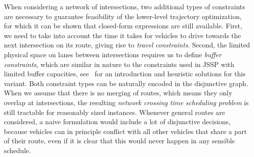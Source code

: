 \documentclass[a4paper]{article}
\theoremstyle{definition}
\theoremstyle{plain}
\begin{document}

When considering a network of intersections, two additional types of constraints
are necessary to guarantee feasibility of the lower-level trajectory
optimization, for which it can be shown that closed-form expressions are still
available. %
First, we need to take into account the time it takes for vehicles to drive
towards the next intersection on its route, giving rise to \textit{travel
  constraints}.
Second, the limited physical space on lanes between intersections requires us to
define \textit{buffer constraints}, which are similar in nature to the constraints used
in JSSP with limited buffer capacities,
see~\cite{heitmannJobshopSchedulingLimited2007} for an introduction and
heuristic solutions for this variant.
Both constraint types can be naturally encoded in the disjunctive graph.
%
When we assume that there is no merging of routes, which means they only overlap
at intersections, the resulting \textit{network crossing time scheduling
  problem} is still tractable for reasonably sized instances. Whenever general
routes are considered, a naive formulation would include a lot of disjunctive
decisions, because vehicles can in principle conflict with all other vehicles
that share a part of their route, even if it is clear that this would never
happen in any sensible schedule.
\end{document}
